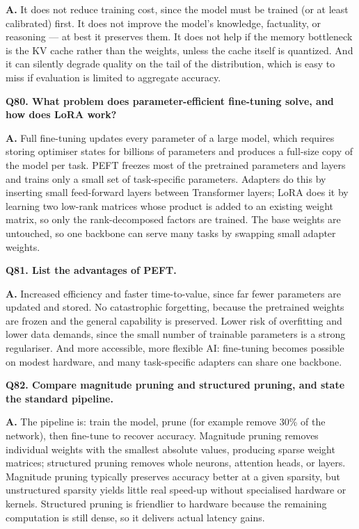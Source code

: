 \documentclass[11pt]{article}
\begin{document}
\noindent\textbf{A.} It does not reduce training cost, since the model must be trained (or at least calibrated) first. It does not improve the model's knowledge, factuality, or reasoning --- at best it preserves them. It does not help if the memory bottleneck is the KV cache rather than the weights, unless the cache itself is quantized. And it can silently degrade quality on the tail of the distribution, which is easy to miss if evaluation is limited to aggregate accuracy.

\medskip
\noindent\textbf{Q80. What problem does parameter-efficient fine-tuning solve, and how does LoRA work?}

\noindent\textbf{A.} Full fine-tuning updates every parameter of a large model, which requires storing optimiser states for billions of parameters and produces a full-size copy of the model per task. PEFT freezes most of the pretrained parameters and layers and trains only a small set of task-specific parameters. Adapters do this by inserting small feed-forward layers between Transformer layers; LoRA does it by learning two low-rank matrices whose product is added to an existing weight matrix, so only the rank-decomposed factors are trained. The base weights are untouched, so one backbone can serve many tasks by swapping small adapter weights.

\medskip
\noindent\textbf{Q81. List the advantages of PEFT.}

\noindent\textbf{A.} Increased efficiency and faster time-to-value, since far fewer parameters are updated and stored. No catastrophic forgetting, because the pretrained weights are frozen and the general capability is preserved. Lower risk of overfitting and lower data demands, since the small number of trainable parameters is a strong regulariser. And more accessible, more flexible AI: fine-tuning becomes possible on modest hardware, and many task-specific adapters can share one backbone.

\medskip
\noindent\textbf{Q82. Compare magnitude pruning and structured pruning, and state the standard pipeline.}

\noindent\textbf{A.} The pipeline is: train the model, prune (for example remove 30\% of the network), then fine-tune to recover accuracy. Magnitude pruning removes individual weights with the smallest absolute values, producing sparse weight matrices; structured pruning removes whole neurons, attention heads, or layers. Magnitude pruning typically preserves accuracy better at a given sparsity, but unstructured sparsity yields little real speed-up without specialised hardware or kernels. Structured pruning is friendlier to hardware because the remaining computation is still dense, so it delivers actual latency gains.
\end{document}
